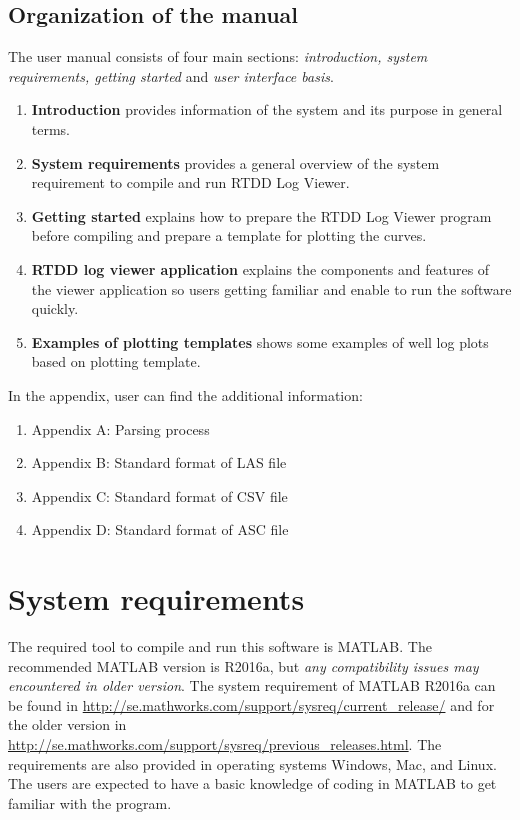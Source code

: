 \documentclass[12pt,a4paper,oneside]{report}
\begin{document}
\section{Organization of the manual}
The user manual consists of four main sections: \emph{introduction, system requirements, getting started} and \emph{user interface basis}.
\begin{enumerate}
\item \textbf{Introduction} provides information of the system and its purpose in general terms.
\item \textbf{System requirements} provides a general overview of the system requirement to compile and run RTDD Log Viewer.
\item \textbf{Getting started} explains how to prepare the RTDD Log Viewer program before compiling and prepare a template for plotting the curves.
\item \textbf{RTDD log viewer application} explains the components and features of the viewer application so users getting familiar and enable to run the software quickly.
\item \textbf{Examples of plotting templates} shows some examples of well log plots based on plotting template.
\end{enumerate}

In the appendix, user can find the additional information:
\begin{enumerate}
\item Appendix A: Parsing process
\item Appendix B: Standard format of LAS file
\item Appendix C: Standard format of CSV file
\item Appendix D: Standard format of ASC file
\end{enumerate} 
  
\chapter{System requirements}
The required tool to compile and run this software is MATLAB. The recommended MATLAB version is R2016a, but \emph{any compatibility issues may encountered in older version}. The system requirement of MATLAB R2016a can be found in \url{http://se.mathworks.com/support/sysreq/current_release/} and for the older version in \url{http://se.mathworks.com/support/sysreq/previous_releases.html}. The requirements are also provided in operating systems Windows, Mac, and Linux. The users are expected to have a basic knowledge of coding in MATLAB to get familiar with the program.
\end{document}
